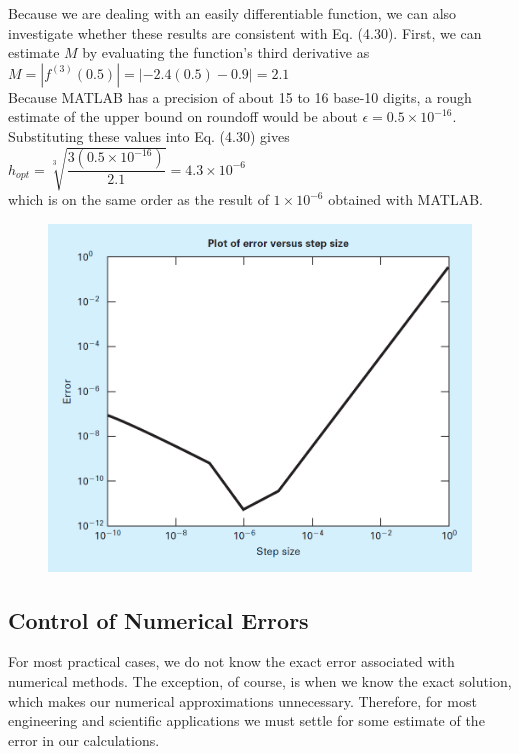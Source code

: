 \documentclass[../main.tex]{subfiles}
\begin{document}
\begin{example}
    Because we are dealing with an easily differentiable function, we can also investigate
    whether these results are consistent with Eq. (4.30). First, we can estimate $M$ by evaluating
    the function's third derivative as\\

    $M = \left\lvert f^{(3)}(0.5) \right\rvert =  \left\lvert -2.4(0.5) - 0.9 \right\rvert = 2.1$\\

    \noindent
    Because MATLAB has a precision of about 15 to 16 base-10 digits, a rough estimate of the
    upper bound on roundoff would be about $\epsilon = 0.5 \times 10^{-16}$. Substituting these values into
    Eq. (4.30) gives\\

    $h_{opt} = \sqrt[3]{\dfrac{3(0.5\times 10^{-16})}{2.1}} = 4.3\times 10^{-6}$\\

    \noindent
    which is on the same order as the result of $1\times 10^{-6}$ obtained with MATLAB.\\

    \begin{figure}[h]
        \includegraphics[width=0.75\linewidth]{./images/fig_4_12}
    \end{figure}
\end{example}


\subsection{Control of Numerical Errors}
\noindent
For most practical cases, we do not know the exact error associated with numerical methods.
The exception, of course, is when we know the exact solution, which makes our numerical
approximations unnecessary. Therefore, for most engineering and scientific applications we
must settle for some estimate of the error in our calculations.
\end{document}
